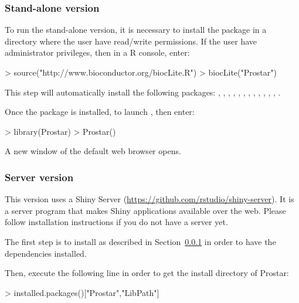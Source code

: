 \documentclass[12pt]{article}
\begin{document}
\subsubsection{Stand-alone version}\label{sec:daparProstarstandalone}

To run the stand-alone version, it is necessary to install the package in a 
directory where the user have read/write permissions. If the user have 
administrator privileges, then in a R console, enter:
\begin{Schunk}
\begin{Sinput}
> source("http://www.bioconductor.org/biocLite.R")
> biocLite("Prostar")
\end{Sinput}
\end{Schunk}

This step will automatically install the following packages: , 
, , ,
, , , 
, , ,
, , .
        
        
Once the package is installed, to launch , then enter:
\begin{Schunk}
\begin{Sinput}
> library(Prostar)
> Prostar()
\end{Sinput}
\end{Schunk}

A new window of the default web browser opens. 


\subsubsection{Server version} \label{sec:daparProstarserver}
This version uses a Shiny Server 
(\url{https://github.com/rstudio/shiny-server}). It is a server program that 
makes Shiny applications available over the web. Please follow installation 
instructions if you do not have a server yet.

The first step is to install  as described in 
Section~\ref{sec:daparProstarstandalone} in order to have the dependencies 
installed.

Then, execute the following line in order to get the install directory of 
Prostar:

\begin{Schunk}
\begin{Sinput}
> installed.packages()["Prostar","LibPath"]
\end{Sinput}
\end{Schunk}
\end{document}
